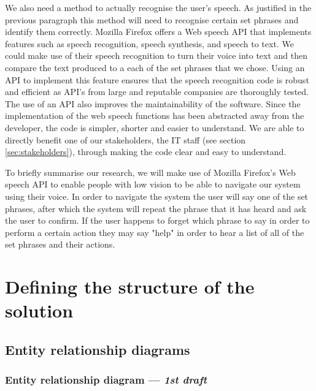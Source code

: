 We also need a method to actually recognise the user's speech.
As justified in the previous paragraph this method will need
to recognise certain set phrases and identify them correctly.
Mozilla Firefox offers a Web speech API that implements 
features such as speech recognition, speech synthesis, and
speech to text. We could make use of their speech recognition
to turn their voice into text and then compare the text
produced to a each of the set phrases that we chose. Using an
API to implement this feature ensures that the speech recognition
code is robust and efficient as API's from large and reputable
companies are thoroughly tested. The use of an API also 
improves the maintainability of the software. Since the
implementation of the web speech functions has been abstracted 
away from the developer, the code is simpler, shorter and easier
to understand. We are able to directly benefit one of our
stakeholders, the IT staff (see section \ref{sec:stakeholders}),
through making the code clear and easy to understand.\\ \vspace{0.2cm}

To briefly summarise our research, we will make use of Mozilla
Firefox's Web speech API to enable people with low vision to be 
able to navigate our system using their voice. In order to navigate
the system the user will say one of the set phrases, after which the 
system will repeat the phrase that it has heard and ask the user 
to confirm. If the user happens to forget which phrase to say in 
order to perform a certain action they may say "help" in order to 
hear a list of all of the set phrases and their actions.

\section{Defining the structure of the solution}

\subsection{Entity relationship diagrams}

\subsubsection{Entity relationship diagram — \textit{1st draft}}
\label{sec:erdd}


